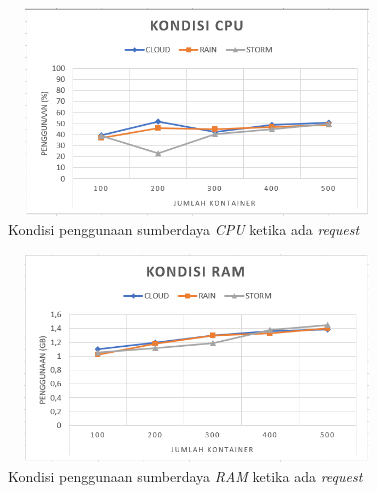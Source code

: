 				\begin{figure}[H]
					\centering
					\includegraphics[width=10cm,height=5.5cm]{Images/C-5/performacpu.PNG}
					\caption{Kondisi penggunaan sumberdaya \textit{CPU} ketika ada \textit{request}}
					\label{performacpu}
				\end{figure}
				
				\begin{figure}[H]
					\centering
					\includegraphics[width=10cm,height=5.5cm]{Images/C-5/performaram.PNG}
					\caption{Kondisi penggunaan sumberdaya \textit{RAM} ketika ada \textit{request}}
					\label{performaram}
				\end{figure}
			
				
			